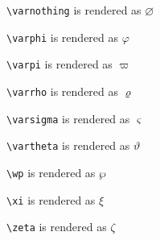 \texttt{\textbackslash varnothing} is rendered as $\varnothing$


\texttt{\textbackslash varphi} is rendered as $\varphi$


\texttt{\textbackslash varpi} is rendered as $\varpi$


\texttt{\textbackslash varrho} is rendered as $\varrho$


\texttt{\textbackslash varsigma} is rendered as $\varsigma$


\texttt{\textbackslash vartheta} is rendered as $\vartheta$


\texttt{\textbackslash wp} is rendered as $\wp$


\texttt{\textbackslash xi} is rendered as $\xi$


\texttt{\textbackslash zeta} is rendered as $\zeta$

